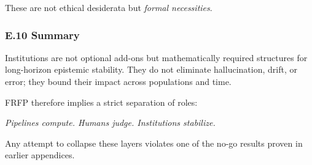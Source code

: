 These are not ethical desiderata but \emph{formal necessities}.

\subsubsection*{E.10 Summary}

Institutions are not optional add-ons but mathematically required structures
for long-horizon epistemic stability. They do not eliminate hallucination,
drift, or error; they bound their impact across populations and time.

FRFP therefore implies a strict separation of roles:

\begin{center}
\emph{Pipelines compute.  
Humans judge.  
Institutions stabilize.}
\end{center}

Any attempt to collapse these layers violates one of the no-go results proven
in earlier appendices.

